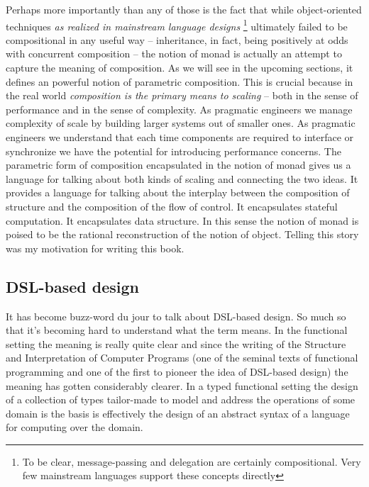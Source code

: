 Perhaps more importantly than any of those is the fact that while
object-oriented techniques \emph{as realized in mainstream language
  designs} \footnote{To be clear, message-passing and delegation are
  certainly compositional. Very few mainstream languages support these
  concepts directly} ultimately failed to be compositional in any
useful way -- inheritance, in fact, being positively at odds with
concurrent composition -- the notion of monad is actually an attempt
to capture the meaning of composition. As we will see in the upcoming
sections, it defines an powerful notion of parametric
composition. This is crucial because in the real world
\emph{composition is the primary means to scaling} -- both in the
sense of performance and in the sense of complexity. As pragmatic
engineers we manage complexity of scale by building larger systems out
of smaller ones. As pragmatic engineers we understand that each time
components are required to interface or synchronize we have the
potential for introducing performance concerns. The parametric form of
composition encapsulated in the notion of monad gives us a language
for talking about both kinds of scaling and connecting the two
ideas. It provides a language for talking about the interplay between
the composition of structure and the composition of the flow of
control. It encapsulates stateful computation. It encapsulates data
structure. In this sense the notion of monad is poised to be the
rational reconstruction of the notion of object. Telling this story
was my motivation for writing this book.

\subsection{DSL-based design}

It has become buzz-word du jour to talk about DSL-based design. So
much so that it's becoming hard to understand what the term means. In
the functional setting the meaning is really quite clear and since the
writing of the Structure and Interpretation of Computer Programs (one
of the seminal texts of functional programming and one of the first to
pioneer the idea of DSL-based design) the meaning has gotten
considerably clearer. In a typed functional setting the design of a
collection of types tailor-made to model and address the operations of
some domain is the basis is effectively the design of an abstract
syntax of a language for computing over the domain.

